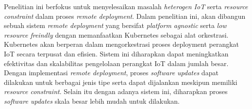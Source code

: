 Penelitian ini berfokus untuk menyelesaikan masalah \textit{heterogen IoT} serta \textit{resource constraint} dalam proses \textit{remote deployment}. Dalam penelitian ini, akan dibangun sebuah sistem \textit{remote deployment} yang bersifat \textit{platform agnostic} serta \textit{low resource freindly} dengan memanfaatkan Kubernetes sebagai alat orkestrasi. Kubernetes akan berperan dalam mengorkestrasi proses deployment perangkat IoT secara terpusat dan efisien. Sistem ini diharapkan dapat meningkatkan efektivitas dan skalabilitas pengelolaan perangkat IoT dalam jumlah besar. Dengan implementasi \textit{remote deployment}, proses \textit{software updates} dapat dilakukan untuk berbagai jenis tipe serta dapat dijalankan meskipun memiliki \textit{resource constraint}. Selain itu dengan adanya sistem ini, diharapkan proses \textit{software updates} skala besar lebih mudah untuk dilakukan.





